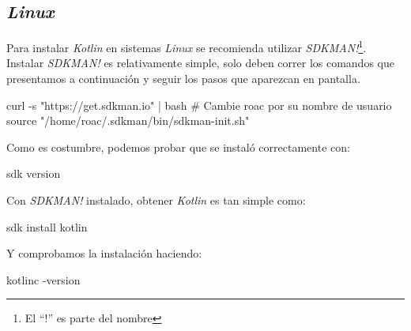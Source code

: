 \subsection{\textit{Linux}}
  Para instalar \textit{Kotlin} en sistemas \textit{Linux} se
  recomienda utilizar \textit{SDKMAN!}\footnote{
    El \enquote{!} es parte del nombre
  }.
  Instalar \textit{SDKMAN!} es relativamente simple, solo deben correr
  los comandos que presentamos a continuación y seguir los pasos
  que aparezcan en pantalla.

  \begin{bash}
    curl -s "https://get.sdkman.io" | bash
    # Cambie roac por su nombre de usuario
    source "/home/roac/.sdkman/bin/sdkman-init.sh"
  \end{bash}

  Como es costumbre, podemos probar que se instaló correctamente con:

  \begin{bash}
    sdk version
  \end{bash}

  Con \textit{SDKMAN!} instalado, obtener \textit{Kotlin} es tan simple como:

  \begin{bash}
    sdk install kotlin
  \end{bash}

  Y comprobamos la instalación haciendo:
  
  \begin{bash}
    kotlinc -version
  \end{bash}